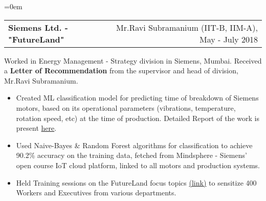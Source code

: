 \documentclass{article}
\makeatletter
\newcommand{\headerrow}[2]
{\begin{tabular*}{\linewidth}{l@{\extracolsep{\fill}}r}
	#1 &
	#2 \\
\end{tabular*}}
\makeatother
\begin{document}
\begin{list} {}{\leftmargin=0em}
    \item[]
    \headerrow {\textbf{Siemens Ltd. - "FutureLand"}}{Mr.Ravi Subramanium (IIT-B, IIM-A), May - July 2018}
    Worked in Energy Management - Strategy division in Siemens, Mumbai. Received a \textbf{Letter of Recommendation} from the supervisor and head of division, Mr.Ravi Subramanium.
    \begin{itemize}
    \setlength\itemsep{0.0em}
        \item Created ML classification model for predicting time of breakdown of Siemens motors, based on its operational parameters (vibrations, temperature, rotation speed, etc) at the time of production. Detailed Report of the work is present \href{https://csciitd-my.sharepoint.com/:b:/g/personal/ee1170938_csciitd_onmicrosoft_com/EasUavDrTmdFrvuYc0rOissBYh8X1WvKKr_OTclVrCd42w?e=wCPjfb}{here}.
        \item Used Naive-Bayes \& Random Forest algorithms for classification to achieve 90.2\% accuracy on the training data, fetched from Mindsphere - Siemens' open course IoT cloud platform, linked to all motors and production systems.
        \item Held Training sessions on the FutureLand focus topics \href{https://www.siemens.com/global/en/home/company/fairs-events/futureland.html}{(link)} to sensitize 400 Workers and Executives from various departments.
    \end{itemize}
    

    

\end{list}
\end{document}
